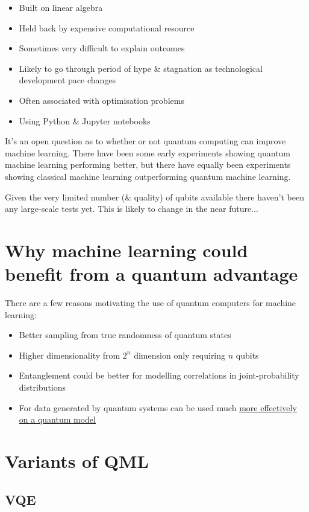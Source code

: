 \documentclass{book}
\begin{document}
\begin{itemize}
    \item Built on linear algebra
    \item Held back by expensive computational resource
    \item Sometimes very difficult to explain outcomes 
    \item Likely to go through period of hype \& stagnation as technological development pace changes
    \item Often associated with optimisation problems 
    \item Using Python \& Jupyter notebooks 
\end{itemize}


It's an open question as to whether or not quantum computing can improve machine learning. There have been some early experiments showing quantum machine learning performing better, but there have equally been experiments showing classical machine learning outperforming quantum machine learning. 

 Given the very limited number (\& quality) of qubits available there haven't been any large-scale tests yet. This is likely to change in the near future...

\section{Why machine learning could benefit from a quantum advantage}

There are a few reasons motivating the use of quantum computers for machine learning:
\begin{itemize}
    \item Better sampling from true randomness of quantum states
    \item Higher dimensionality from $2^n$ dimension only requiring $n$ qubits
    \item Entanglement could be better for modelling correlations in joint-probability distributions
    \item For data generated by quantum systems can be used much \href{https://www.science.org/doi/10.1126/science.abn7293}{more effectively on a quantum model}
\end{itemize}

\section{Variants of QML} 

\subsection{VQE}
\end{document}
